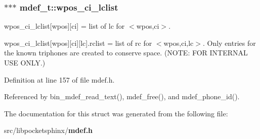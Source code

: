 \subsubsection[{wpos\+\_\+ci\+\_\+lclist}]{$\ast$$\ast$$\ast$ mdef\+\_\+t\+::wpos\+\_\+ci\+\_\+lclist}\label{structmdef__t_a5dd5c3d3058a314f4c971a14d1df5f38}


wpos\+\_\+ci\+\_\+lclist[wpos][ci] = list of lc for $<$wpos,ci$>$. 

wpos\+\_\+ci\+\_\+lclist[wpos][ci][lc].rclist = list of rc for $<$wpos,ci,lc$>$. Only entries for the known triphones are created to conserve space. (N\+O\+T\+E\+: F\+O\+R I\+N\+T\+E\+R\+N\+A\+L U\+S\+E O\+N\+L\+Y.) 

Definition at line 157 of file mdef.\+h.



Referenced by bin\+\_\+mdef\+\_\+read\+\_\+text(), mdef\+\_\+free(), and mdef\+\_\+phone\+\_\+id().



The documentation for this struct was generated from the following file\+:\begin{DoxyCompactItemize}
\item 
src/libpocketsphinx/{\bf mdef.\+h}\end{DoxyCompactItemize}
